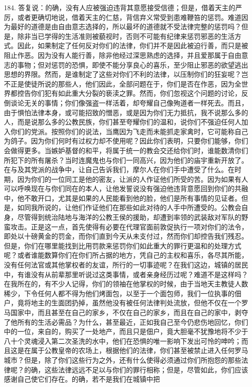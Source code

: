 184. 答复说：的确，没有人应被强迫违背其意愿接受信德；但是，借着天主的严厉，或者更确切地说，借着天主的仁慈，背信弃义常受到患难鞭笞的惩罚。难道因为最好的道德是由自由意志选择的，所以最坏的道德就不受法律完整的惩罚吗？但是，除非当已学得的生活准则被藐视时，否则不可能有纪律来惩罚邪恶的生活方式。因此，如果制定了任何反对你们的法律，你们并不是因此被迫行善，而只是被阻止作恶。因为没有人能行善，除非他经过深思熟虑的选择，并且爱那属于自由意志的事物；但对惩罚的恐惧，即使不能分享良心的喜乐，至少阻止邪恶的欲望逃出思想的界限。然而，是谁制定了这些对你们不利的法律，以压制你们的狂妄呢？岂不正是使徒所说的那些人，他们因此，全部问题在于，你们是否在作恶，因为全世界都控告你们犯有如此重大分裂的亵渎之罪。然而，你们忽视这个问题的讨论，反倒谈论无关的事情；你们像强盗一样活着，却夸耀自己像殉道者一样死去。而且，由于惧怕法律本身，或可能招致的憎恶，或是因为你们无力抵抗，我不说那么多的人，而是说那么多的公教民族，你们甚至夸耀你们的温和，说你们不强迫任何人加入你们的党派。按照你们的说法，当鹰因为飞走而未能抓走家禽时，它可能称自己为鸽子。因为你们何时有过权力却不使用呢？因此你们表明，只要你们能够，你们会做得更多。当嫉妒基督的和平，将属于统一的教会交还给你们时，谁能数清你们所犯下的所有屠杀？当时连魔鬼也与你们一同高兴，因为他们的庙宇重新开放了。在与及其党派的战争中，让自己告诉我们，摩尔人在你们手中遭受了什么。在时期，因为你们的一位同工是他的密友，让派的人作证他们所受的苦。因为如果有人可以呼唤现在与你们同在的本人，让他发誓说没有强迫他违背意愿回到你们的共融中，他不敢开口，尤其是如果的人民能看到他的脸，他们是所有事情的见证者。但是，如同我所说的，让他们作证他们在那些如此对待的人手中所遭受的。公教会自身，尽管得到统治陆地与海洋的公教王侯的援助，却遭到率领的武装敌对军队的野蛮攻击。正是这一点，首先使得有必要在代理官面前敦促执行一项对你们的法令，即处以十磅黄金的罚金，而你们直到今天从未支付过，然而你们却控告我们残忍。但是，你们在哪里能找到比用罚款来惩罚你们如此重大的罪行更温和的处理方式呢？或者谁能数算你们在你们所占据的地方，凭自己的主权和喜乐，各尽其所能，没有任何法官或其他掌权者的友谊，所行的一切事迹呢？在我们这边，城镇的居民中，有谁没有从前辈那里听说过这类事情，或者亲身经历过呢？难道不是这样吗？在我所在的，有不少人记得，你们的领袖在他掌权的时候，由于当地天主教徒人数稀少，下令任何人都不得为他们烤面包，以至于一个面包师，我们一位执事的佃户，竟将地主的生面团扔掉，虽然他没有被任何法律判处流放，但他不仅在一个罗马国家中，而且甚至在自己的家乡，不仅在自己的家乡，而且在自己的家中，剥夺了他所有的生活必需品？为什么，甚至最近，正如我自己至今仍悲伤地回忆，你们中的一位，来自的，购买了一处地产，而且只是佃户，竟大胆毫不犹豫地将不少于八十个灵魂浸入第二次圣洗的水中，他们在恐惧的唯一影响下发出可怜的呻吟；而且这是在属于公教皇帝的农场上，根据他们的法律，你们甚至被禁止进入任何罗马城市？但是，除了你们这些行为之外，还有什么使得必须通过你们所抱怨的那些法律呢？的确，这些法律远远不足以与你们的罪行相称；但是，尽管如此，你们应该感谢自己使它们存在。的确，若不是我们在城镇中把